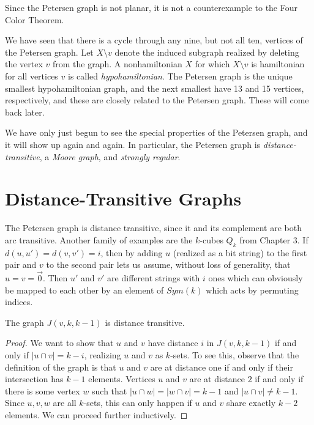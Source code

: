 Since the Petersen graph is not planar, it is not a counterexample to the Four Color Theorem.  

We have seen that there is a cycle through any nine, but not all ten, vertices of the Petersen graph.  Let $X\setminus v$ denote the induced subgraph realized by deleting the vertex $v$ from the graph.  A nonhamiltonian $X$ for which $X\setminus v$ is hamiltonian for all vertices $v$ is called \textit{hypohamiltonian}.  The Petersen graph is the unique smallest hypohamiltonian graph, and the next smallest have 13 and 15 vertices, respectively, and these are closely related to the Petersen graph.  These will come back later.

We have only just begun to see the special properties of the Petersen graph, and it will show up again and again.  In particular, the Petersen graph is \textit{distance-transitive}, a \textit{Moore graph}, and \textit{strongly regular}.


\section*{Distance-Transitive Graphs}

The Petersen graph is distance transitive, since it and its complement are both arc transitive.  Another family of examples are the $k$-cubes $Q_k$ from Chapter 3.  If $d(u,u')=d(v,v')=i$, then by adding $u$ (realized as a bit string) to the first pair and $v$ to the second pair lets us assume, without loss of generality, that $u=v=\vec{0}$.  Then $u'$ and $v'$ are different strings with $i$ ones which can obviously be mapped to each other by an element of $Sym(k)$ which acts by permuting indices.

\begin{lemma}
	The graph $J(v,k,k-1)$ is distance transitive.
\end{lemma} 
\begin{proof}
	We want to show that  $u$ and $v$ have distance $i$ in $J(v,k,k-1)$ if and only if $|u\cap v|=k-i$, realizing $u$ and $v$ as $k$-sets.  To see this, observe that the definition of the graph is that $u$ and $v$ are at distance one if and only if their intersection has $k-1$ elements.  Vertices $u$ and $v$ are at distance $2$ if and only if there is some vertex $w$ such that $|u\cap w|=|w\cap v|=k-1$ and $|u\cap v|\neq k-1$.  Since $u,v,w$ are all $k$-sets, this can only happen if $u$ and $v$ share exactly $k-2$ elements.  We can proceed further inductively.  
\end{proof}

